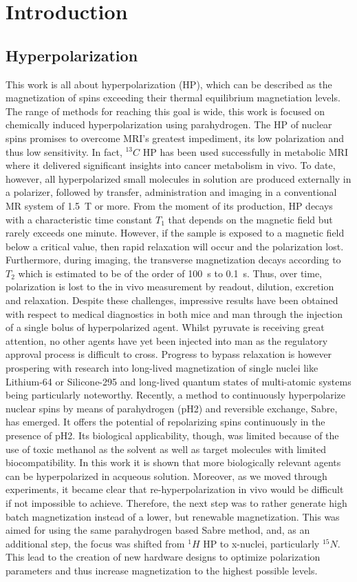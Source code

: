 \chapter{Introduction}\label{chap:introduction}
\section{Hyperpolarization}
This work is all about hyperpolarization (HP), which can be described as the magnetization of spins exceeding their thermal equilibrium magnetiation levels. The range of methods for reaching this goal is wide, this work is focused on chemically induced hyperpolarization using parahydrogen.
The HP of nuclear spins promises to overcome MRI's greatest impediment, its low polarization and thus low sensitivity. In fact, $^{13}C$ HP has been used successfully in metabolic MRI where it delivered significant insights into cancer metabolism in vivo. To date, however, all hyperpolarized small molecules in solution are produced externally in a polarizer, followed by transfer, administration and imaging in a conventional MR system of \SI{1.5}{\tesla} or more. From the moment of its production, HP decays with a characteristic time constant $T_1$ that depends on the magnetic field but rarely exceeds one minute. However, if the sample is exposed to a magnetic field below a critical value, then rapid relaxation will occur and the polarization lost. Furthermore, during imaging, the transverse magnetization decays according to $T_2$ which is estimated to be of the order of \SI{100}{\second} to  \SI{0.1}{\second}. Thus, over time, polarization is lost to the in vivo measurement by readout, dilution, excretion and relaxation. Despite these challenges, impressive results have been obtained with respect to medical diagnostics in both mice and man through the injection of a single bolus of hyperpolarized agent. Whilst pyruvate is receiving great attention, no other agents have yet been injected into man as the regulatory approval process is difficult to cross. Progress to bypass relaxation is however prospering with research into long-lived magnetization of single nuclei like Lithium-64 or Silicone-295 and long-lived quantum states of multi-atomic systems being particularly noteworthy. Recently, a method to continuously hyperpolarize  nuclear spins by means of parahydrogen (pH2) and reversible exchange, Sabre, has emerged. It offers the potential of repolarizing spins continuously in the presence of pH2. Its biological applicability, though, was limited because of the use of toxic methanol as the solvent as well as target molecules with limited biocompatibility. In this work it is shown that more biologically relevant agents can be hyperpolarized in acqueous solution. Moreover, as we moved through experiments, it became clear that re-hyperpolarization in vivo would be difficult if not impossible to achieve. Therefore, the next step was to rather generate high batch magnetization instead of a lower, but renewable magnetization. This was aimed for using the same parahydrogen based Sabre method, and, as an additional step, the focus was shifted from $^1H$ HP to x-nuclei, particularly $^{15}N$. This lead to the creation of new hardware designs to optimize polarization parameters and thus increase magnetization to the highest possible levels.
